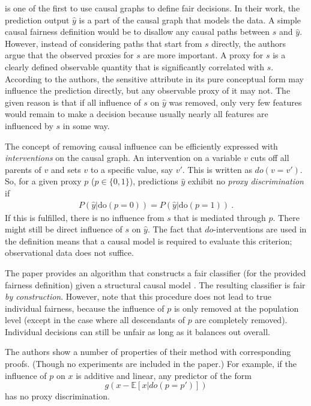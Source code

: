 
\citet{kilbertus2017avoiding} is one of the first to use causal graphs to define fair decisions. In
their work, the prediction output \(\hat{y}\) is a part of the causal graph that models the data. A
simple causal fairness definition would be to disallow any causal paths between \(s\) and
\(\hat{y}\). However, instead of considering paths that start from \(s\) directly, the authors
argue that the observed proxies for \(s\) are more important. A proxy for \(s\) is a clearly
defined observable quantity that is significantly correlated with \(s\). According to the authors,
the sensitive attribute in its pure conceptual form may influence the prediction directly, but any
observable proxy of it may not. The given reason is that if all influence of \(s\) on \(\hat{y}\)
was removed, only very few features would remain to make a decision because usually nearly all
features are influenced by \(s\) in some way.

The concept of removing causal influence can be efficiently expressed with \emph{interventions} on
the causal graph. An intervention on a variable \(v\) cuts off all parents of \(v\) and sets \(v\)
to a specific value, say \(v'\). This is written as \(do(v=v')\). So, for a given proxy \(p\) (\(p
\in \{0, 1\}\)), predictions \(\hat{y}\) exhibit no \emph{proxy discrimination} if \begin{align}
\label{eq:proxy-discrimination} P(\hat{y} | \text{do}(p=0)) = P(\hat{y}|\text{do}(p=1))~.
\end{align} If this is fulfilled, there is no influence from \(s\) that is mediated through \(p\).
There might still be direct influence of \(s\) on \(\hat{y}\). The fact that \(do\)-interventions
are used in the definition means that a causal model is required to evaluate this criterion;
observational data does not suffice.

The paper provides an algorithm that constructs a fair classifier (for the provided fairness
definition) given a structural causal model \citep{pearl2009causality}. The resulting classifier is
fair \emph{by construction}. However, note that this procedure does not lead to true individual
fairness, because the influence of \(p\) is only removed at the population level (except in the
case where all descendants of \(p\) are completely removed). Individual decisions can still be
unfair as long as it balances out overall.

The authors show a number of properties of their method with corresponding proofs. (Though no
experiments are included in the paper.) For example, if the influence of \(p\) on \(x\) is additive
and linear, any predictor of the form \[g(x - \mathbb{E}[x|do(p=p')])\] has no proxy
discrimination.

